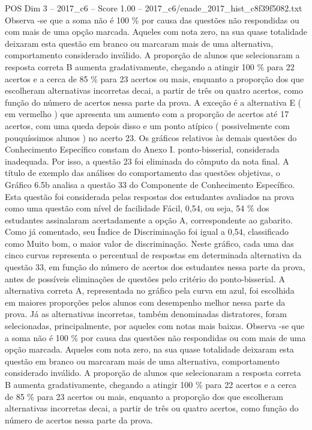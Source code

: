 \begin{textsample}{POS Dim 3 – 2017\_c6 – Score 1.00 – 2017\_c6/enade\_2017\_hist\_c8f39f5082.txt}
Observa -se que a soma não é 100 \% por causa das questões não respondidas ou com mais de uma opção marcada.
Aqueles com nota zero, na sua quase totalidade deixaram esta questão em branco ou marcaram mais de uma alternativa, comportamento considerado inválido.
A proporção de alunos que selecionaram a resposta correta B aumenta gradativamente, chegando a atingir 100 \% para 22 acertos e a cerca de 85 \% para 23 acertos ou mais, enquanto a proporção dos que escolheram alternativas incorretas decai, a partir de três ou quatro acertos, como função do número de acertos nessa parte da prova.
A exceção é a alternativa E ( em vermelho ) que apresenta um aumento com a proporção de acertos até 17 acertos, com uma queda depois disso e um ponto atípico ( possivelmente com pouquíssimos alunos ) no acerto 23.
Os gráficos relativos às demais questões do Conhecimento Específico constam do Anexo I. ponto-bisserial, considerada inadequada.
Por isso, a questão 23 foi eliminada do cômputo da nota final.
A título de exemplo das análises do comportamento das questões objetivas, o Gráfico 6.5b analisa a questão 33 do Componente de Conhecimento Específico.
Esta questão foi considerada pelas respostas dos estudantes avaliados na prova como uma questão com nível de facilidade Fácil, 0,54, ou seja, 54 \% dos estudantes assinalaram acertadamente a opção A, correspondente ao gabarito.
Como já comentado, seu Índice de Discriminação foi igual a 0,54, classificado como Muito bom, o maior valor de discriminação.
Neste gráfico, cada uma das cinco curvas representa o percentual de respostas em determinada alternativa da questão 33, em função do número de acertos dos estudantes nessa parte da prova, antes de possíveis eliminações de questões pelo critério do ponto-bisserial.
A alternativa correta A, representada no gráfico pela curva em azul, foi escolhida em maiores proporções pelos alunos com desempenho melhor nessa parte da prova.
Já as alternativas incorretas, também denominadas distratores, foram selecionadas, principalmente, por aqueles com notas mais baixas.
Observa -se que a soma não é 100 \% por causa das questões não respondidas ou com mais de uma opção marcada.
Aqueles com nota zero, na sua quase totalidade deixaram esta questão em branco ou marcaram mais de uma alternativa, comportamento considerado inválido.
A proporção de alunos que selecionaram a resposta correta B aumenta gradativamente, chegando a atingir 100 \% para 22 acertos e a cerca de 85 \% para 23 acertos ou mais, enquanto a proporção dos que escolheram alternativas incorretas decai, a partir de três ou quatro acertos, como função do número de acertos nessa parte da prova.

\end{textsample}

